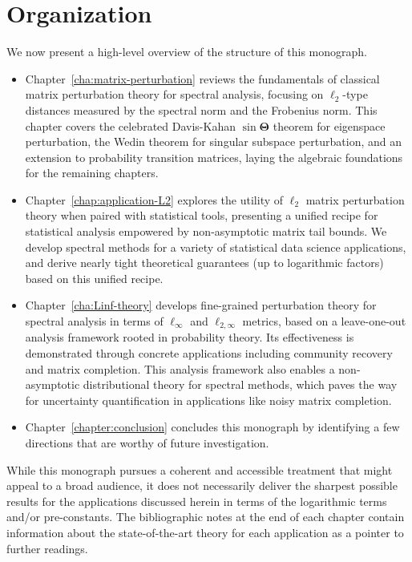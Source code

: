 \section{Organization}

We now present a high-level overview of the structure of this monograph.
%
\begin{itemize}
\item
Chapter~\ref{cha:matrix-perturbation} reviews the fundamentals of classical matrix perturbation theory for spectral analysis, focusing on $\ell_2$-type distances measured by the spectral norm and the Frobenius norm. This chapter covers the celebrated Davis-Kahan $\sin\bm{\Theta}$ theorem for eigenspace perturbation, the Wedin theorem for singular subspace perturbation, and an extension to probability transition matrices, laying the algebraic foundations for the remaining chapters.

\item
Chapter~\ref{chap:application-L2} explores the utility of $\ell_2$ matrix perturbation theory when paired with statistical tools,
presenting a unified recipe for statistical analysis empowered by non-asymptotic matrix tail bounds.
We develop spectral methods for a variety of statistical data science applications,
and derive nearly tight theoretical guarantees (up to logarithmic factors) based on this unified recipe.

\item Chapter~\ref{cha:Linf-theory} develops fine-grained perturbation theory for spectral analysis in terms of  $\ell_{\infty}$ and $\ell_{2,\infty}$ metrics, based on a leave-one-out analysis framework rooted in probability theory. Its effectiveness is demonstrated through concrete applications including community recovery and matrix completion.
  This analysis framework also enables a non-asymptotic distributional theory for spectral methods, which paves the way for uncertainty quantification in applications like noisy matrix completion. 



\item  Chapter~\ref{chapter:conclusion} concludes this monograph by identifying a few directions that are worthy of future investigation.

\end{itemize}

\noindent While this monograph pursues a coherent and accessible treatment that might appeal to a broad audience,
it does not necessarily deliver the sharpest possible results for the applications discussed herein in terms of the logarithmic terms and/or pre-constants.
The bibliographic notes at the end of each chapter contain information about the state-of-the-art theory for each application as a pointer to further readings.




